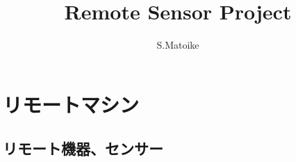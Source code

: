\documentclass[12pt,a4paper,uplatex]{jsarticle}
\title{Remote Sensor Project}
\author{S.Matoike}
\begin{document}
\maketitle

\tableofcontents



\section{リモートマシン}

\subsection{リモート機器、センサー}
\end{document}
